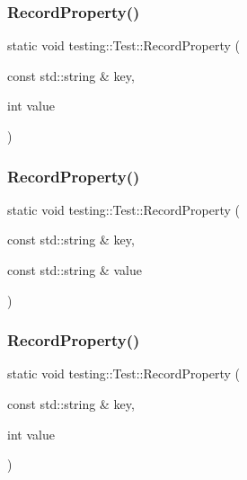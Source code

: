 \mbox{\label{classtesting_1_1_test_af602903efb17730b977304fc56500881}} 
\subsubsection{\texorpdfstring{RecordProperty()}{RecordProperty()}\hspace{0.1cm}{\footnotesize\ttfamily [4/6]}}
{\footnotesize\ttfamily static void testing\+::\+Test\+::\+Record\+Property (\begin{DoxyParamCaption}\item[{const std\+::string \&}]{key,  }\item[{int}]{value }\end{DoxyParamCaption})\hspace{0.3cm}{\ttfamily [static]}}

\mbox{\label{classtesting_1_1_test_ae0448aec9e389fab70f6a75a59ff6aa2}} 
\subsubsection{\texorpdfstring{RecordProperty()}{RecordProperty()}\hspace{0.1cm}{\footnotesize\ttfamily [5/6]}}
{\footnotesize\ttfamily static void testing\+::\+Test\+::\+Record\+Property (\begin{DoxyParamCaption}\item[{const std\+::string \&}]{key,  }\item[{const std\+::string \&}]{value }\end{DoxyParamCaption})\hspace{0.3cm}{\ttfamily [static]}}

\mbox{\label{classtesting_1_1_test_af602903efb17730b977304fc56500881}} 
\subsubsection{\texorpdfstring{RecordProperty()}{RecordProperty()}\hspace{0.1cm}{\footnotesize\ttfamily [6/6]}}
{\footnotesize\ttfamily static void testing\+::\+Test\+::\+Record\+Property (\begin{DoxyParamCaption}\item[{const std\+::string \&}]{key,  }\item[{int}]{value }\end{DoxyParamCaption})\hspace{0.3cm}{\ttfamily [static]}}


